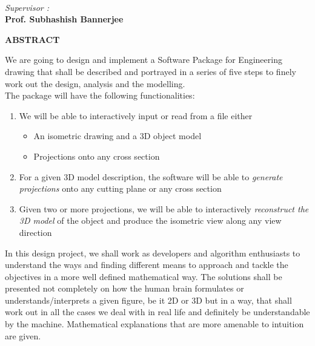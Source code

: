 \documentclass[12pt]{report}
\begin{document}
\begin{center}
\begin{multicols*}{2}
\begin{flushleft}
\end{flushleft}


\columnbreak

\begin{flushleft}

\textit{\\Supervisor :\\ }
\textbf{Prof. Subhashish Bannerjee} \\[5pt]

\end{flushleft}

\end{multicols*}

\end{center}

\newpage



\begin{center}
\Large \bf ABSTRACT
\end{center}
\vspace{0.2in}

We are going to design and implement a Software Package for Engineering drawing that shall be described and portrayed in a series of five steps to finely work out the design, analysis and the modelling.
\\
\vspace{0.3cm}
The package will have the following functionalities:

\begin{enumerate}
  \item
  We will be able to interactively input or read from a file either
  \begin{itemize}
    \item
    An isometric drawing and a 3D object model 
    \item
    Projections onto any cross section
  \end{itemize}
  \item
  For a given 3D model description, the software will be able to \textit{generate projections} onto any cutting plane or any cross section
  \item
  Given two or more projections, we will be able to interactively \textit{reconstruct the 3D model} of the object and produce the isometric view along any view direction

\end{enumerate}

\vspace{0.5cm}
In this design project, we shall work as developers and algorithm enthusiasts to understand the ways and finding different means to approach and tackle the objectives in a more well defined mathematical way. The solutions shall be presented not completely on how the human brain formulates or understands/interprets a given figure, be it 2D or 3D but in a way, that shall work out in all the cases we deal with in real life and definitely be understandable by the machine. Mathematical explanations that are more amenable to intuition are given.
\end{document}
